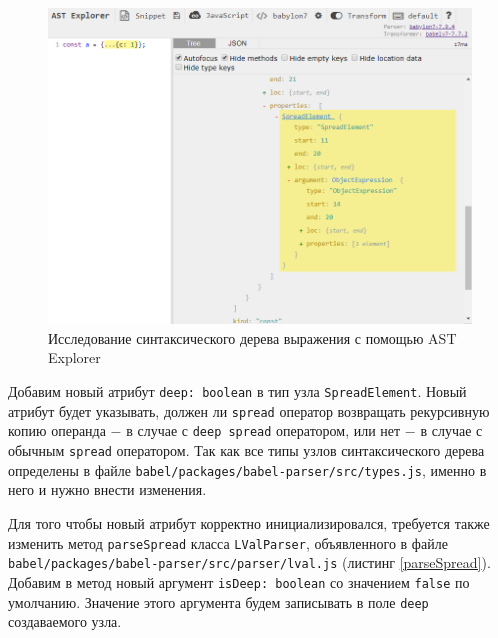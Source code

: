 \documentclass[14pt, a4paper]{article}
\def\code#1{\texttt{#1}} %
\begin{document}
\begin{figure}[h!]
  \centering
  \includegraphics[scale=0.7]{img/ast-explorer.png}
  \caption{Исследование синтаксического дерева выражения с помощью AST Explorer}
  \label{ast_explorer}
\end{figure}


Добавим новый атрибут \code{deep: boolean} в тип узла \code{SpreadElement}. Новый атрибут будет указывать,
должен ли \code{spread} оператор возвращать рекурсивную копию операнда $-$ в случае с \code{deep spread} оператором,
или нет $-$ в случае с обычным \code{spread} оператором. Так как все типы узлов синтаксического дерева 
определены в файле \code{babel/packages/babel-parser/src/types.js}, именно в него и нужно внести изменения. 




Для того чтобы новый атрибут корректно инициализировался, требуется также изменить метод \code{parseSpread} класса
\code{LValParser}, объявленного в файле \code{babel/packages/babel-parser/src/parser/lval.js} (листинг \ref{parseSpread}). 
Добавим в метод новый аргумент \code{isDeep: boolean} со значением \code{false} по умолчанию. Значение этого аргумента будем записывать 
в поле \code{deep} создаваемого узла.
\end{document}
